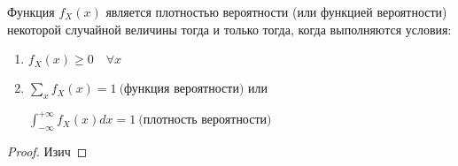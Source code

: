 \documentclass[document]{subfiles}
\begin{document}
\begin{theorem}
    Функция $f_X(x)$ является плотностью вероятности (или функцией вероятности) некоторой случайной величины тогда и только тогда, когда выполняются условия:
    \begin{enumerate}
        \item $f_X(x) \ge 0 \quad \forall x$
        \item $\sum_x f_X(x) =1 ~\text{(функция вероятности)}$ или 

            $\int_{-\infty}^{+\infty}f_X(x)dx = 1 ~ \text{(плотность вероятности)}$
    \end{enumerate}
\end{theorem}
\begin{proof}
    Изич
\end{proof}
\end{document}
